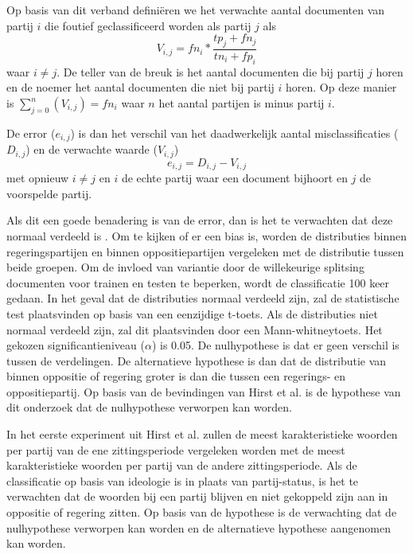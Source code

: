 Op basis van dit verband definiëren we het verwachte aantal documenten van partij $i$ die foutief geclassificeerd worden als partij $j$ als
\begin{equation}
\label{eq:expected}
V_{i,j}  = fn_i *  \frac{tp_{j}+fn_{j}}{tn_{i}+fp_{i}}
\end{equation}
waar $i\neq j$. De teller van de breuk is het aantal documenten die bij partij $j$ horen en de noemer het aantal documenten die niet bij partij $i$ horen. Op deze manier is $\sum_{j=0}^{n} (V_{i,j}) = fn_i$ waar $n$ het aantal partijen is minus partij $i$.\par
De error ($e_{i,j}$) is dan het verschil van  het daadwerkelijk aantal misclassificaties ($D_{i,j}$) en de verwachte waarde ($V_{i,j}$)
\begin{equation}
\label{eq:error}
e_{i,j} = D_{i,j} - V_{i,j}
\end{equation}
met opnieuw $i\neq j$ en $i$ de echte partij waar een document bijhoort en $j$ de voorspelde partij. \par
Als dit een goede benadering is van de error, dan is het te verwachten dat deze normaal verdeeld is \cite{citeulike:7531484}. Om te kijken of er een bias is, worden de distributies binnen regeringspartijen en binnen oppositiepartijen vergeleken met de distributie tussen beide groepen. Om de invloed van variantie door de willekeurige splitsing documenten voor trainen en testen te beperken, wordt de classificatie 100 keer gedaan. In het geval dat de distributies normaal verdeeld zijn, zal de statistische test plaatsvinden op basis van een eenzijdige t-toets. Als de distributies niet normaal verdeeld zijn, zal dit plaatsvinden door een Mann-whitneytoets. Het gekozen significantieniveau ($\alpha$) is 0.05. De nulhypothese is dat er geen verschil is tussen de verdelingen. De alternatieve hypothese is dan dat de distributie van binnen oppositie of regering groter is dan die tussen een regerings- en oppositiepartij. Op basis van de bevindingen van Hirst et al. is de hypothese van dit onderzoek dat de nulhypothese verworpen kan worden.\par
In het eerste experiment uit Hirst et al. zullen de meest karakteristieke woorden per partij van de ene zittingsperiode vergeleken worden met de meest karakteristieke woorden per partij van de andere zittingsperiode. Als de classificatie op basis van ideologie is in plaats van partij-status, is het te verwachten dat de woorden bij een partij blijven en niet gekoppeld zijn aan in oppositie of regering zitten. Op basis van de hypothese is de verwachting dat de nulhypothese verworpen kan worden en de alternatieve hypothese aangenomen kan worden.\par
